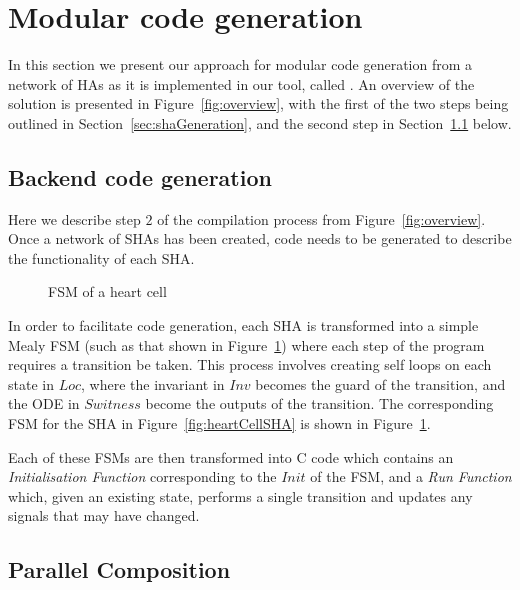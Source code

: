 \section{Modular code generation}
\label{sec:codeGen}

In this section we present our approach for modular code generation from a network of \acp{HA} as it is implemented in our tool, called \ourTool.
An overview of the solution is presented in Figure~\ref{fig:overview}, with the first of the two steps being outlined in Section~\ref{sec:shaGeneration}, and the second step in Section~\ref{sec:backendCodeGeneration} below.



\subsection{Backend code generation}
\label{sec:backendCodeGeneration}

Here we describe step $2$ of the compilation process from Figure~\ref{fig:overview}.
Once a network of \acp{SHA} has been created, code needs to be generated to describe the functionality of each \ac{SHA}.

\begin{figure}
	\centering
	
	\caption{\acf{FSM} of a heart cell \label{fig:heartCellFSM}}
\end{figure}

In order to facilitate code generation, each \ac{SHA} is transformed into a simple Mealy \ac{FSM} (such as that shown in Figure~\ref{fig:heartCellFSM}) where each step of the program requires a transition be taken.
This process involves creating self loops on each state in $Loc$, where the invariant in $Inv$ becomes the guard of the transition, and the \acs{ODE} in $Switness$ become the outputs of the transition.
The corresponding \ac{FSM} for the \ac{SHA} in Figure~\ref{fig:heartCellSHA} is shown in Figure~\ref{fig:heartCellFSM}.

Each of these \acp{FSM} are then transformed into C code which contains an \emph{Initialisation Function} corresponding to the $Init$ of the \ac{FSM}, and a \emph{Run Function} which, given an existing state, performs a single transition and updates any signals that may have changed.


\subsection{Parallel Composition}
\label{sec:composition}

